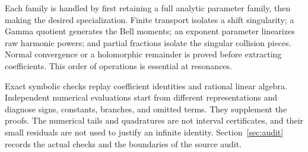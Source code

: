 Each family is handled by first retaining a full analytic parameter
family, then making the desired specialization. Finite transport
isolates a shift singularity; a Gamma quotient generates the Bell
moments; an exponent parameter linearizes raw harmonic powers; and
partial fractions isolate the singular collision pieces. Normal
convergence or a holomorphic remainder is proved before extracting
coefficients. This order of operations is essential at resonances.

Exact symbolic checks replay coefficient identities and rational
linear algebra. Independent numerical evaluations start from different
representations and diagnose signs, constants, branches, and omitted
terms. They supplement the proofs. The numerical tails and quadratures
are not interval certificates, and their small residuals are not used
to justify an infinite identity. Section~\ref{sec:audit} records the
actual checks and the boundaries of the source audit.
